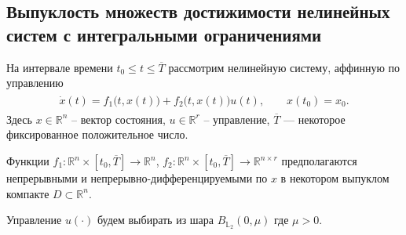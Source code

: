 \documentclass[../main.tex]{subfiles}
\begin{document}
    \subsection{Выпуклость множеств достижимости нелинейных систем с интегральными ограничениями}
    На интервале времени $ t_0 \leqslant t \leqslant \overline{T} $ рассмотрим нелинейную систему, аффинную по управлению
	\begin{gather}\label{sec1:nonlinear}
		\begin{gathered}
			\dot{x}(t)=f_1\big(t,x(t)\big)+f_2\big(t,x(t)\big)u(t), \qquad x(t_0) = x_0.
		\end{gathered}
	\end{gather}
	Здесь $ x \in \mathbb{R}^n $ -- вектор состояния, $ u \in \mathbb{R}^r $ -- управление,  $ \overline{T} $ --- некоторое фиксированное положительное число.
	
	Функции $ f_1:\mathbb{R}^n \times [t_0, \overline{T}] \rightarrow \mathbb{R}^{n} $, $ f_2: \mathbb{R}^n \times [t_0, \overline{T}] \rightarrow \mathbb{R}^{n \times r} $ предполагаются непрерывными и непрерывно-дифференцируемыми по $ x $ в некотором выпуклом компакте $D  \subset \mathbb{R}^n$. 
	
%	
	Управление $ u(\cdot) $ будем выбирать из шара $ B_{\mathbb{L}_2}(0,\mu) $ где $ \mu > 0$.
	
\end{document}
